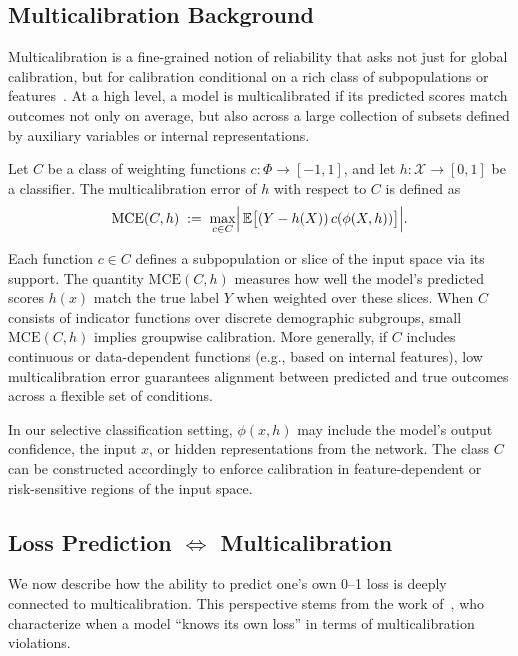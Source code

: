 \subsection{Multicalibration Background}

Multicalibration is a fine-grained notion of reliability that asks not just for global calibration, but for calibration conditional on a rich class of subpopulations or features~\citep{hebert2018multicalibration}. At a high level, a model is multicalibrated if its predicted scores match outcomes not only on average, but also across a large collection of subsets defined by auxiliary variables or internal representations.

\begin{definition}
\label{def:mce}
Let \(C\) be a class of weighting functions \(c\colon\Phi\to[-1,1]\), and let \(h\colon\mathcal{X} \to [0,1]\) be a classifier. The multicalibration error of \(h\) with respect to \(C\) is defined as
\begin{equation}
\mathrm{MCE}(C,h)
\;:=\;
\max_{c\in C}
\Bigl|\,
\mathbb{E}\bigl[(Y - h(X))\,c(\phi(X,h))\bigr]
\Bigr|.
\end{equation}
\end{definition}

Each function \(c \in C\) defines a subpopulation or slice of the input space via its support. The quantity \(\mathrm{MCE}(C,h)\) measures how well the model's predicted scores \(h(x)\) match the true label \(Y\) when weighted over these slices. When \(C\) consists of indicator functions over discrete demographic subgroups, small \(\mathrm{MCE}(C,h)\) implies groupwise calibration. More generally, if \(C\) includes continuous or data-dependent functions (e.g., based on internal features), low multicalibration error guarantees alignment between predicted and true outcomes across a flexible set of conditions.

In our selective classification setting, \(\phi(x,h)\) may include the model’s output confidence, the input \(x\), or hidden representations from the network. The class \(C\) can be constructed accordingly to enforce calibration in feature-dependent or risk-sensitive regions of the input space.


\subsection{Loss Prediction \texorpdfstring{$\Longleftrightarrow$}{<=>} Multicalibration}

We now describe how the ability to predict one’s own 0--1 loss is deeply connected to multicalibration. This perspective stems from the work of~\citet{gollakota2025loss}, who characterize when a model “knows its own loss” in terms of multicalibration violations. 

